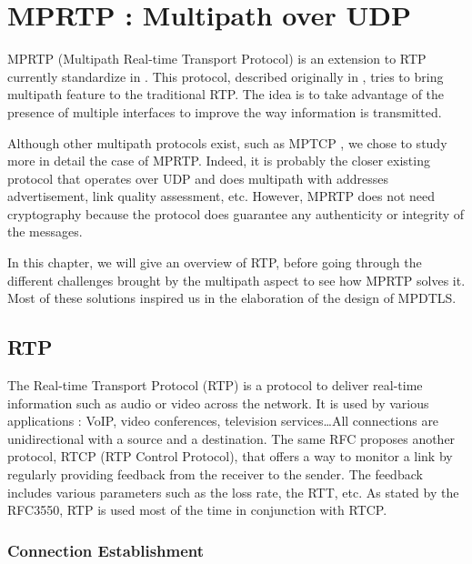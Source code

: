 \chapter{MPRTP : Multipath over UDP}
\label{chap:mprtp}

MPRTP (Multipath Real-time Transport Protocol) is an extension to RTP currently standardize in \cite{singh-avtcore-mprtp}. This protocol, described originally in \cite{singh2013mprtp}, tries to bring multipath feature to the traditional RTP. The idea is to take advantage of the presence of multiple interfaces to improve the way information is transmitted.

Although other multipath protocols exist, such as MPTCP \cite{RFC6824}, we chose to study more in detail the case of MPRTP. Indeed, it is probably the closer existing protocol that operates over UDP and does multipath with addresses advertisement, link quality assessment, etc. However, MPRTP does not need cryptography because the protocol does guarantee any authenticity or integrity of the messages.

In this chapter, we will give an overview of RTP, before going through the different challenges brought by the multipath aspect to see how MPRTP solves it. Most of these solutions inspired us in the elaboration of the design of MPDTLS.

\section{RTP}

The Real-time Transport Protocol (RTP) \cite{RFC3550} is a protocol to deliver real-time information such as audio or video across the network.  It is used by various applications : VoIP, video conferences, television services\dots All connections are unidirectional with a source and a destination. The same RFC proposes another protocol, RTCP (RTP Control Protocol), that offers a way to monitor a link by regularly providing feedback from the receiver to the sender. The feedback includes various parameters such as the loss rate, the RTT, etc. As stated by the RFC3550, RTP is used most of the time in conjunction with RTCP.

\subsection{Connection Establishment}

